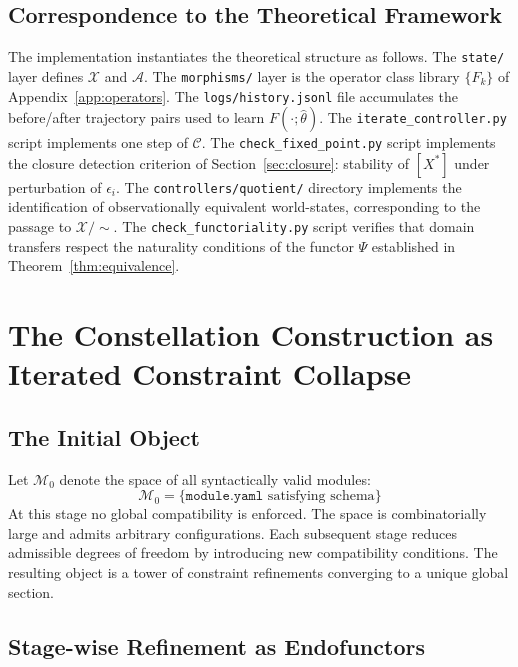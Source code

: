 \documentclass[12pt, oneside]{article}
\newcommand{\Xmod}{\mathcal{X}/{\sim}}
\begin{document}
\subsection{Correspondence to the Theoretical Framework}

The implementation instantiates the theoretical structure as follows. The
\texttt{state/} layer defines $\mathcal{X}$ and $\mathcal{A}$. The
\texttt{morphisms/} layer is the operator class library $\{F_k\}$ of
Appendix~\ref{app:operators}. The \texttt{logs/history.jsonl} file accumulates the
before/after trajectory pairs used to learn $F(\cdot;\hat{\theta})$. The
\texttt{iterate\_controller.py} script implements one step of $\mathcal{C}$.
The \texttt{check\_fixed\_point.py} script implements the closure detection criterion
of Section~\ref{sec:closure}: stability of $[X^*]$ under perturbation of $\epsilon_i$.
The \texttt{controllers/quotient/} directory implements the identification of
observationally equivalent world-states, corresponding to the passage to $\Xmod$.
The \texttt{check\_functoriality.py} script verifies that domain transfers respect
the naturality conditions of the functor $\Psi$ established in
Theorem~\ref{thm:equivalence}.

\section{The Constellation Construction as Iterated Constraint Collapse}
\label{app:filtration}

\subsection{The Initial Object}

Let $\mathcal{M}_0$ denote the space of all syntactically valid modules:
\[
\mathcal{M}_0 = \{ \texttt{module.yaml} \text{ satisfying schema} \}
\]
At this stage no global compatibility is enforced. The space is combinatorially large
and admits arbitrary configurations. Each subsequent stage reduces admissible degrees of
freedom by introducing new compatibility conditions. The resulting object is a tower of
constraint refinements converging to a unique global section.

\subsection{Stage-wise Refinement as Endofunctors}
\end{document}
